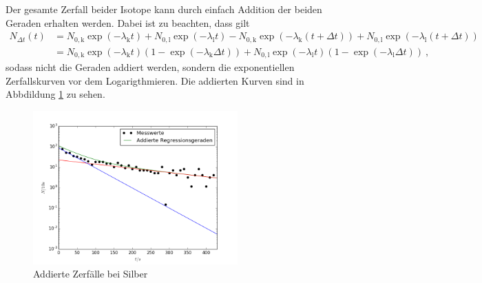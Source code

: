 Der gesamte Zerfall beider Isotope kann durch einfach Addition der beiden Geraden erhalten werden. Dabei ist zu beachten, dass gilt
\begin{align}
N_{\Delta t}(t) &= N_{0,\text{k}}\exp(-\lambda_\text{k} t) + N_{0,\text{l}}\exp(-\lambda_\text{l} t) - N_{0,\text{k}}\exp(-\lambda_\text{k}(t+\Delta t)) + N_{0,\text{l}}\exp(-\lambda_\text{l}(t+\Delta t)) \\
	&= N_{0,\text{k}}\exp(-\lambda_\text{k} t)\left( 1 - \exp(-\lambda_\text{k}\Delta t)\right)
	+ N_{0,\text{l}}\exp(-\lambda_\text{l} t)\left( 1 - \exp(-\lambda_\text{l}\Delta t)\right) \ , 
\end{align}
sodass nicht die Geraden addiert werden, sondern die exponentiellen Zerfallskurven vor dem Logarigthmieren. Die addierten Kurven sind in Abbdildung \ref{fig:addiert} zu sehen.
\begin{figure}[h!]
        \centering
        \includegraphics[width=0.7\textwidth]{build/SilberAddiert.png}
        \caption{Addierte Zerfälle bei Silber}
        \label{fig:addiert}
\end{figure}

